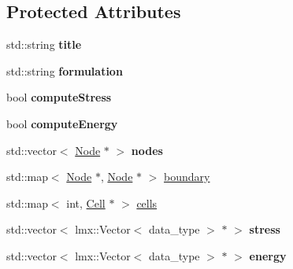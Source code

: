 \subsection*{Protected Attributes}
\begin{CompactItemize}
\item 
\hypertarget{classmknix_1_1FlexBody_f11fe27b1478f6ce517f723ca657d90b}{
std::string \textbf{title}}
\label{classmknix_1_1FlexBody_f11fe27b1478f6ce517f723ca657d90b}

\item 
\hypertarget{classmknix_1_1FlexBody_cb6f1ed2a9f207ceb39d485aabc2fbcf}{
std::string \textbf{formulation}}
\label{classmknix_1_1FlexBody_cb6f1ed2a9f207ceb39d485aabc2fbcf}

\item 
\hypertarget{classmknix_1_1FlexBody_aacb11b0809c01edca2c7ef4ea41de7a}{
bool \textbf{computeStress}}
\label{classmknix_1_1FlexBody_aacb11b0809c01edca2c7ef4ea41de7a}

\item 
\hypertarget{classmknix_1_1FlexBody_653efdbfbf4f6ec147407a1c7ffb3779}{
bool \textbf{computeEnergy}}
\label{classmknix_1_1FlexBody_653efdbfbf4f6ec147407a1c7ffb3779}

\item 
\hypertarget{classmknix_1_1FlexBody_22bdd921d63cf15ae9216320bb69238f}{
std::vector$<$ \hyperlink{classmknix_1_1Node}{Node} $\ast$ $>$ \textbf{nodes}}
\label{classmknix_1_1FlexBody_22bdd921d63cf15ae9216320bb69238f}

\item 
std::map$<$ \hyperlink{classmknix_1_1Node}{Node} $\ast$, \hyperlink{classmknix_1_1Node}{Node} $\ast$ $>$ \hyperlink{classmknix_1_1FlexBody_ceffa0715f6180a5945fe4cccb6723a9}{boundary}
\item 
std::map$<$ int, \hyperlink{classmknix_1_1Cell}{Cell} $\ast$ $>$ \hyperlink{classmknix_1_1FlexBody_9ad2c335bec4ab136091934de6379a67}{cells}
\item 
\hypertarget{classmknix_1_1FlexBody_b7e82d08982714b26de3fff2a281d4f2}{
std::vector$<$ lmx::Vector$<$ data\_\-type $>$ $\ast$ $>$ \textbf{stress}}
\label{classmknix_1_1FlexBody_b7e82d08982714b26de3fff2a281d4f2}

\item 
\hypertarget{classmknix_1_1FlexBody_9152c5c0047a854fd4875082e6ca191e}{
std::vector$<$ lmx::Vector$<$ data\_\-type $>$ $\ast$ $>$ \textbf{energy}}
\label{classmknix_1_1FlexBody_9152c5c0047a854fd4875082e6ca191e}

\end{CompactItemize}


